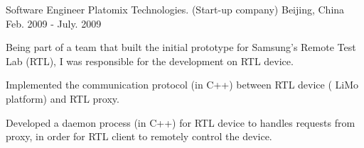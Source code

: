 \begin{cventries}
  \cventry
    {Software Engineer} %
    {Platomix Technologies. (Start-up company)} %
    {Beijing, China} %
    {Feb. 2009 - July. 2009} %
    {
      \begin{cvitems} %
        \item {Being part of a team that built the initial prototype for
    Samsung's Remote Test Lab (RTL), I was responsible for the
    development on RTL device.}
       \item {Implemented the communication protocol (in C++) between RTL device (
    LiMo platform) and RTL proxy.}
       \item {Developed a daemon process (in C++) for RTL
    device to handles requests from proxy, in order for RTL client
    to remotely control the device.}
      \end{cvitems}
    }

\end{cventries}

